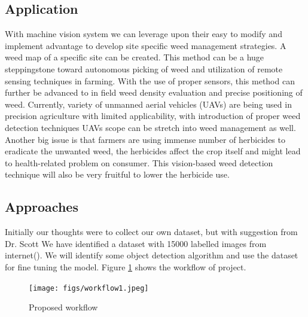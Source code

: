 \documentclass{report}
\begin{document}
\subsection{Application}
With machine vision system we can leverage upon their easy to modify and implement advantage to
 develop site specific weed management strategies. A weed map of a specific site can be created. This method can be a huge steppingstone toward autonomous picking of weed and utilization of remote sensing techniques in farming. With the use of proper sensors, this method can further be advanced to in field weed density evaluation and precise positioning of weed.  Currently, variety of unmanned aerial vehicles (UAVs) are being used in precision agriculture with limited applicability, with introduction of proper weed detection techniques UAVs scope can be stretch into weed management as well. Another big issue is that farmers are using immense number of herbicides to eradicate the unwanted weed, the herbicides affect the crop itself and might lead to health-related problem on consumer. This vision-based weed detection technique will also be very fruitful to lower the herbicide use.

\subsection{Approaches}
Initially our thoughts were to collect our own dataset, but with suggestion from Dr. Scott We have identified a dataset with 15000 labelled images from internet(). We will identify some object detection algorithm and use the dataset for fine tuning the model. Figure \ref{fig:process} shows the workflow of project.\par 

\begin{figure}[h]
    \centering
    \texttt{[image: figs/workflow1.jpeg]}
    \caption{ Proposed workflow}
    \label{fig:process}
\end{figure}
\newpage
\end{document}
